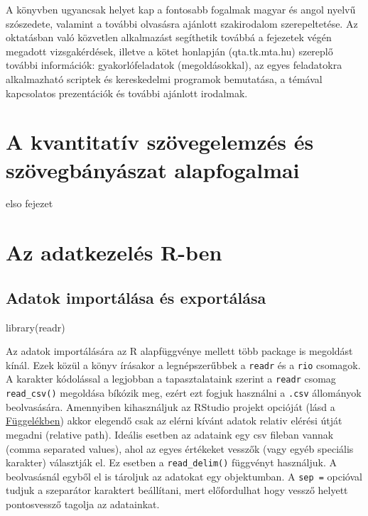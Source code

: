 \documentclass[
]{book}
\newenvironment{Shaded}{\begin{snugshade}}{\end{snugshade}}
\newcommand{\FunctionTok}[1]{\textcolor[rgb]{0.00,0.00,0.00}{#1}}
\newcommand{\NormalTok}[1]{#1}
\begin{document}
A könyvben ugyancsak helyet kap a fontosabb fogalmak magyar és angol
nyelvű szószedete, valamint a további olvasásra ajánlott szakirodalom
szerepeltetése. Az oktatásban való közvetlen alkalmazást segíthetik
továbbá a fejezetek végén megadott vizsgakérdések, illetve a kötet
honlapján (qta.tk.mta.hu) szereplő további információk:
gyakorlófeladatok (megoldásokkal), az egyes feladatokra alkalmazható
scriptek és kereskedelmi programok bemutatása, a témával kapcsolatos
prezentációk és további ajánlott irodalmak.

\hypertarget{a-kvantitatuxedv-szuxf6vegelemzuxe9s-uxe9s-szuxf6vegbuxe1nyuxe1szat-alapfogalmai}{%
\chapter{A kvantitatív szövegelemzés és szövegbányászat
alapfogalmai}\label{a-kvantitatuxedv-szuxf6vegelemzuxe9s-uxe9s-szuxf6vegbuxe1nyuxe1szat-alapfogalmai}}

elso fejezet

\hypertarget{az-adatkezeluxe9s-r-ben}{%
\chapter{Az adatkezelés R-ben}\label{az-adatkezeluxe9s-r-ben}}

\hypertarget{adatok-importuxe1luxe1sa-uxe9s-exportuxe1luxe1sa}{%
\section{Adatok importálása és
exportálása}\label{adatok-importuxe1luxe1sa-uxe9s-exportuxe1luxe1sa}}

\begin{Shaded}
\begin{Highlighting}[]
\FunctionTok{library}\NormalTok{(readr)}
\end{Highlighting}
\end{Shaded}

Az adatok importálására az R alapfüggvénye mellett több package is
megoldást kínál. Ezek közül a könyv írásakor a legnépszerűbbek a
\texttt{readr} és a \texttt{rio} csomagok. A karakter kódolással a
legjobban a tapasztalataink szerint a \texttt{readr} csomag
\texttt{read\_csv()} megoldása bíkózik meg, ezért ezt fogjuk használni a
\texttt{.csv} állományok beolvasására. Amennyiben kihasználjuk az
RStudio projekt opcióját (lásd a
\protect\hyperlink{projektmunka}{Függelékben}) akkor elegendő csak az
elérni kívánt adatok relativ elérési útját megadni (relative path).
Ideális esetben az adataink egy csv fileban vannak (comma separated
values), ahol az egyes értékeket vesszők (vagy egyéb speciális karakter)
választják el. Ez esetben a \texttt{read\_delim()} függvényt használjuk.
A beolvasásnál egyből el is tároljuk az adatokat egy objektumban. A
\texttt{sep\ =} opcióval tudjuk a szeparátor karaktert beállítani, mert
előfordulhat hogy vessző helyett pontosvessző tagolja az adatainkat.
\end{document}
